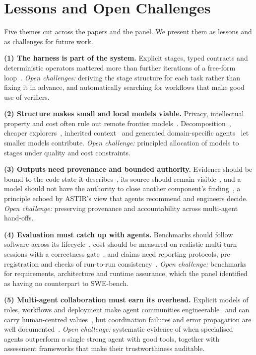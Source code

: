 \section{Lessons and Open Challenges}
\label{sec:lessons}

Five themes cut across the papers and the panel. We present them as lessons and as challenges for future work.

\textbf{(1) The harness is part of the system.} Explicit stages, typed contracts and deterministic operators mattered more than further iterations of a free-form loop~\cite{agdev26:dente,agdev26:alawad,agdev26:gao,agdev26:spiridonov,agdev26:osmanoglu}. \emph{Open challenges:} deriving the stage structure for each task rather than fixing it in advance, and automatically searching for workflows that make good use of verifiers.

\textbf{(2) Structure makes small and local models viable.} Privacy, intellectual property and cost often rule out remote frontier models~\cite{agdev26:le,agdev26:garciadominguez}. Decomposition~\cite{agdev26:dente}, cheaper explorers~\cite{agdev26:alawad}, inherited context~\cite{agdev26:kerbel} and generated domain-specific agents~\cite{agdev26:garciadominguez} let smaller models contribute. \emph{Open challenge:} principled allocation of models to stages under quality and cost constraints.

\textbf{(3) Outputs need provenance and bounded authority.} Evidence should be bound to the code state it describes~\cite{agdev26:gao}, its source should remain visible~\cite{agdev26:le,agdev26:chen}, and a model should not have the authority to close another component's finding~\cite{agdev26:le}, a principle echoed by ASTIR's view that agents recommend and engineers decide. \emph{Open challenge:} preserving provenance and accountability across multi-agent hand-offs.

\textbf{(4) Evaluation must catch up with agents.} Benchmarks should follow software across its lifecycle~\cite{agdev26:jureczka}, cost should be measured on realistic multi-turn sessions with a correctness gate~\cite{agdev26:zergetaev}, and claims need reporting protocols, pre-registration and checks of run-to-run consistency~\cite{agdev26:khanna,agdev26:kerbel,agdev26:stengg}. \emph{Open challenge:} benchmarks for requirements, architecture and runtime assurance, which the panel identified as having no counterpart to SWE-bench.

\textbf{(5) Multi-agent collaboration must earn its overhead.} Explicit models of roles, workflows and deployment make agent communities engineerable~\cite{agdev26:vu,agdev26:ait} and can carry human-centred values~\cite{agdev26:pesare}, but coordination failures and error propagation are well documented~\cite{cemri2025mast,kim2025scaling}. \emph{Open challenge:} systematic evidence of when specialised agents outperform a single strong agent with good tools, together with assessment frameworks that make their trustworthiness auditable.

